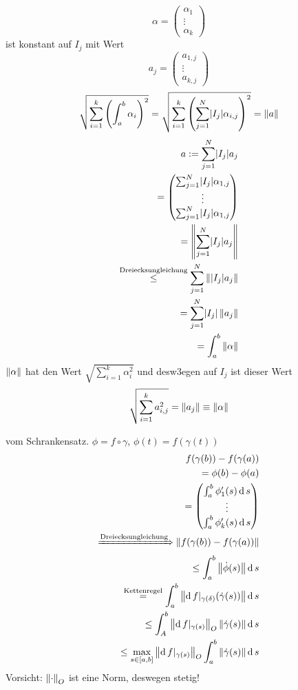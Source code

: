\begin{Bew}
  \[\alpha = \begin{pmatrix}
    \alpha_1\\ \vdots \\ \alpha_k
  \end{pmatrix}\]
  ist konstant auf $I_j$ mit Wert
  \[a_j = \begin{pmatrix}
    a_{1,j}\\ \vdots \\ a_{k,j}
  \end{pmatrix}\]
  \[\sqrt{\sum_{i=1}^k\left( \int_a^b\alpha_i \right)^2}=\sqrt{\sum_{i=1}^k\left( \sum_{j=1}^N\mathopen| I_j \mathclose|\alpha_{i,j} \right)^2}=\left\| a \right\|\]
  \begin{eqnarray*}
    a:=\sum_{j=1}^N\mathopen| I_j \mathclose|a_j\\
    = \begin{pmatrix}
      \sum_{j=1}^N\mathopen| I_j \mathclose|\alpha_{1,j}\\
      \vdots \\
      \sum_{j=1}^N\mathopen| I_j \mathclose|\alpha_{1,j}\\
    \end{pmatrix}\\
    = \left\| \sum_{j=1}^N\mathopen| I_j \mathclose|a_j \right\|\\
    \stackrel{\text{Dreiecksungleichung}}{\leq}\sum_{j=1}^N\left\| \mathopen| I_j \mathclose|a_j \right\|\\
    =\sum_{j=1}^N\mathopen| I_j \mathclose|\left\| a_j \right\|\\
    =\int_a^b\left\| \alpha \right\|
  \end{eqnarray*}
  $\left\| \alpha \right\|$ hat den Wert $\sqrt{\sum_{i=1}^k\alpha_i^2}$ und desw3egen auf $I_j$ ist dieser Wert
  \[\sqrt{\sum^k_{i=1}a_{i,j}^2}=\left\| a_j \right\|\equiv\left\| \alpha \right\|\]
\end{Bew}
\begin{Bew}
  vom Schrankensatz. $\phi=f\circ \gamma$, $\phi(t)=f(\gamma(t))$
  \begin{eqnarray*}
    f(\gamma(b))-f(\gamma(a))\\
    =\phi(b)-\phi(a)\\
    = \begin{pmatrix}
      \int_a^b\phi_1'(s)\operatorname{d} s\\
      \vdots \\
      \int_a^b\phi_k'(s)\operatorname{d} s\\
    \end{pmatrix}\\
    \xRightarrow{\text{Dreiecksungleichung}}\left\| f(\gamma(b))-f(\gamma(a)) \right\|\\
    \leq \int_a^b\left\| \dot\phi(s) \right\|\operatorname{d} s\\
    \stackrel{\text{Kettenregel}}{=}\int_a^b\left\| \operatorname{d} f|_{\gamma(\delta)}(\dot\gamma(s)) \right\|\operatorname{d} s\\
    \leq \int_A^b\left\| \operatorname{d} f|_{\gamma(s)} \right\|_O\left\| \dot\gamma(s) \right\|\operatorname{d} s\\
    \leq \max_{s\in [a,b]}\left\| \operatorname{d} f|_{\gamma(s)} \right\|_O\int_a^b\left\| \dot\gamma(s) \right\|\operatorname{d} s
  \end{eqnarray*}
  Vorsicht: $\left\| \cdot \right\|_O$ ist eine Norm, deswegen stetig!
\end{Bew}
